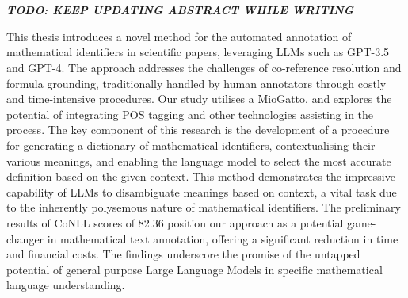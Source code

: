 \chapter{\abstractname}

\textbf{\textit{TODO: KEEP UPDATING ABSTRACT WHILE WRITING}}


This thesis introduces a novel method for the automated annotation of mathematical identifiers in scientific papers, leveraging \ac{LLMs} such as GPT-3.5 and GPT-4. The approach addresses the challenges of co-reference resolution and formula grounding, traditionally handled by human annotators through costly and time-intensive procedures. Our study utilises a \ac{MioGatto}, and explores the potential of integrating \ac{POS} tagging and other technologies assisting in the process.
The key component of this research is the development of a procedure for generating a dictionary of mathematical identifiers, contextualising their various meanings, and enabling the language model to select the most accurate definition based on the given context. This method demonstrates the impressive capability of LLMs to disambiguate meanings based on context, a vital task due to the inherently polysemous nature of mathematical identifiers.
The preliminary results of \ac{CoNLL} scores of 82.36 position our approach as a potential game-changer in mathematical text annotation, offering a significant reduction in time and financial costs.
The findings underscore the promise of the untapped potential of general purpose Large Language Models in specific mathematical language understanding.

